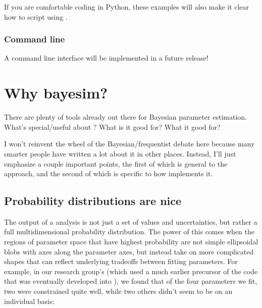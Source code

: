 \documentclass[letterpaper,10pt,english]{sphinxmanual}
\begin{document}
If you are comfortable coding in Python, these examples will also make it clear how to script using .


\subsection{Command line}
\label{\detokenize{gettingstarted:command-line}}
A command line interface will be implemented in a future release!


\chapter{Why bayesim?}
\label{\detokenize{whybayesim:why-bayesim}}\label{\detokenize{whybayesim::doc}}
There are plenty of tools already out there for Bayesian parameter estimation. What’s special/useful about ? What is it good for? What  it good for?

I won’t reinvent the wheel of the Bayesian/frequentist debate here because many smarter people have written a lot about it in other places. Instead, I’ll just emphasize a couple important points, the first of which is general to the approach, and the second of which is specific to how  implements it.


\section{Probability distributions are nice}
\label{\detokenize{whybayesim:probability-distributions-are-nice}}
The output of a  analysis is not just a set of values and uncertainties, but rather a full multidimensional probability distribution. The power of this comes when the regions of parameter space that have highest probability are not simple ellipsoidal blobs with axes along the parameter axes, but instead take on more complicated shapes that can reflect underlying tradeoffs between fitting parameters. For example, in our research group’s  (which used a much earlier precursor of the code that was eventually developed into ), we found that of the four parameters we fit, two were constrained quite well, while two others didn’t seem to be on an individual basis:
\end{document}
